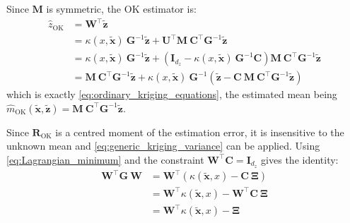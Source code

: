 Since $\mathbf{M}$ is symmetric, the OK estimator is:
\begin{equation}
	\begin{aligned}
	\hat{z}_{\mathrm{OK}}&=\mathbf{W}^\top\tilde{\mathbf{z}}\\
	&=\kappa(x,\tilde{\mathbf{x}})\:\mathbf{G}^{-1}\tilde{\mathbf{z}}+\mathbf{U}^\top \mathbf{M}\:\mathbf{C}^\top \mathbf{G}^{-1}\tilde{\mathbf{z}}\\
	&=\kappa(x,\tilde{\mathbf{x}})\:\mathbf{G}^{-1}\tilde{\mathbf{z}}+\left(\mathbf{I}_{d_z}-\kappa(x,\tilde{\mathbf{x}})\:\mathbf{G}^{-1}\mathbf{C}\right)\mathbf{M}\:\mathbf{C}^\top \mathbf{G}^{-1}\tilde{\mathbf{z}}\\
	&=\mathbf{M}\:\mathbf{C}^\top \mathbf{G}^{-1}\tilde{\mathbf{z}}+\kappa(x,\tilde{\mathbf{x}})\:\mathbf{G}^{-1}\left(\tilde{\mathbf{z}}-\mathbf{C}\:\mathbf{M}\:\mathbf{C}^\top \mathbf{G}^{-1}\tilde{\mathbf{z}}\right)
	\end{aligned}
\end{equation}
which is exactly \eqref{eq:ordinary_kriging_equations}, the estimated mean being $\hat{m}_{\mathrm{OK}}(\tilde{\mathbf{x}},\tilde{\mathbf{z}})=\mathbf{M}\:\mathbf{C}^\top \mathbf{G}^{-1}\tilde{\mathbf{z}}$.

Since $\mathbf{R}_{\mathrm{OK}}$ is a centred moment of the estimation error, it is insensitive to the unknown mean and \eqref{eq:generic_kriging_variance} can be applied. Using \eqref{eq:Lagrangian_minimum} and the constraint $\mathbf{W}^\top \mathbf{C}=\mathbf{I}_{d_z}$ gives the identity:
\begin{equation}
	\begin{aligned}
	\mathbf{W}^\top \mathbf{G}\:\mathbf{W}&=\mathbf{W}^\top\left(\kappa(\tilde{\mathbf{x}},x)-\mathbf{C}\:\boldsymbol{\Xi}\right)\\
	&=\mathbf{W}^\top \kappa(\tilde{\mathbf{x}},x)-\mathbf{W}^\top \mathbf{C}\:\boldsymbol{\Xi}\\
	&=\mathbf{W}^\top \kappa(\tilde{\mathbf{x}},x)-\boldsymbol{\Xi}
	\end{aligned}\label{eq:OK_identity}
\end{equation}

